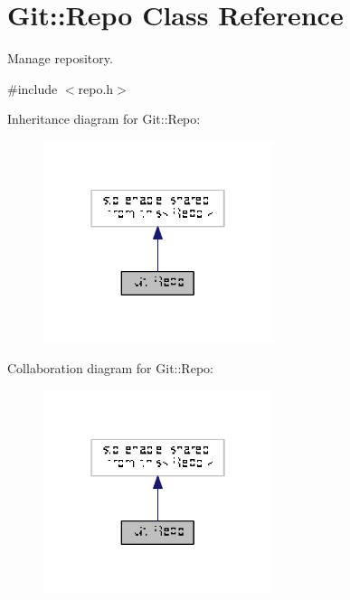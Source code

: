 \hypertarget{class_git_1_1_repo}{\section{Git\-:\-:Repo Class Reference}
\label{class_git_1_1_repo}
}


Manage repository.  




{\ttfamily \#include $<$repo.\-h$>$}



Inheritance diagram for Git\-:\-:Repo\-:\nopagebreak
\begin{figure}[H]
\begin{center}
\leavevmode
\includegraphics[width=190pt]{class_git_1_1_repo__inherit__graph}
\end{center}
\end{figure}


Collaboration diagram for Git\-:\-:Repo\-:\nopagebreak
\begin{figure}[H]
\begin{center}
\leavevmode
\includegraphics[width=190pt]{class_git_1_1_repo__coll__graph}
\end{center}
\end{figure}
